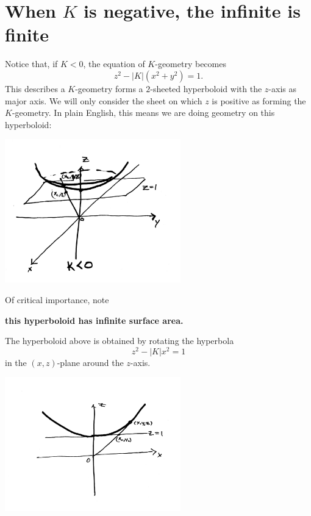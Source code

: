 \documentclass{ximera}
\begin{document}
\section{When $K$ is negative, the infinite is finite}


Notice that, if $K<0$, the equation of $K$-geometry becomes
\[
z^{2}-|K|\left(x^{2}+y^{2}\right)  =1.
\]
This describes a $K$-geometry forms a $2$-sheeted hyperboloid with the
$z$-axis as major axis. We will only consider the sheet on which $z$
is positive as forming the $K$-geometry. In plain English, this means
we are doing geometry on this hyperboloid:
\begin{image}
\includegraphics[width=3in]{UpperHyperboloid.png}
\end{image}
Of critical importance, note

\begin{center}
  \textbf{this hyperboloid has infinite surface area.}
\end{center}

The hyperboloid above is obtained by rotating the hyperbola
\[
z^{2}-\left\vert K\right\vert x^{2}= 1
\]
in the $(x,z)$-plane around the $z$-axis.
\begin{image}
\includegraphics[width=3in]{UpperHyperbola.png}
\end{image}
\end{document}
